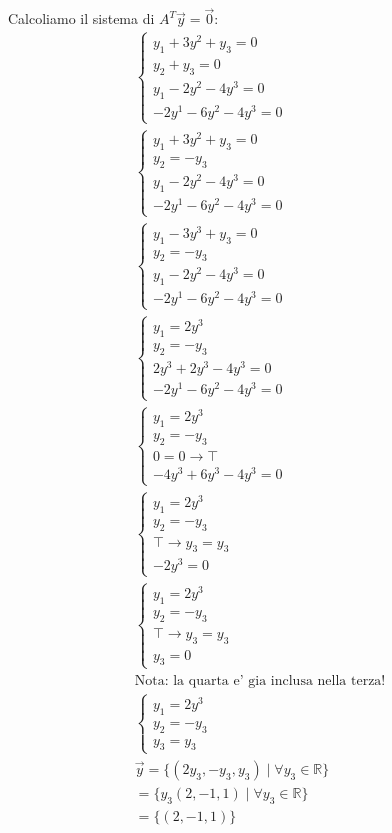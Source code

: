 \documentclass{article}
\begin{document}
Calcoliamo il sistema di $A^T\vec{y}=\vec{0}$:
\begin{align*}
    \begin{cases}
        y_1+3y^2+y_3=0 \\
        y_2+y_3=0 \\
        y_1-2y^2-4y^3=0 \\
        -2y^1-6y^2-4y^3=0
    \end{cases}\\
    \begin{cases}
        y_1+3y^2+y_3=0 \\
        y_2=-y_3 \\
        y_1-2y^2-4y^3=0 \\
        -2y^1-6y^2-4y^3=0
    \end{cases}\\
    \begin{cases}
        y_1-3y^3+y_3=0 \\
        y_2=-y_3 \\
        y_1-2y^2-4y^3=0 \\
        -2y^1-6y^2-4y^3=0
    \end{cases}\\
    \begin{cases}
        y_1=2y^3 \\
        y_2=-y_3 \\
        2y^3+2y^3-4y^3=0 \\
        -2y^1-6y^2-4y^3=0
    \end{cases}\\
    \begin{cases}
        y_1=2y^3 \\
        y_2=-y_3 \\
        0=0 \to \top \\
        -4y^3+6y^3-4y^3=0
    \end{cases}\\
    \begin{cases}
        y_1=2y^3 \\
        y_2=-y_3 \\
       \top \to y_3=y_3\\
        -2y^3=0
    \end{cases}\\
    \begin{cases}
        y_1=2y^3 \\
        y_2=-y_3 \\
       \top \to y_3=y_3\\
        y_3=0 
    \end{cases}\\
    \text{Nota: la quarta e' gia inclusa nella terza!}\\
    \begin{cases}
        y_1=2y^3 \\
        y_2=-y_3 \\
        y_3=y_3
    \end{cases}\\
    \vec{y}=\{(2y_3,-y_3,y_3) \mid \forall y_3 \in \mathbb{R}\}\\
    =\{y_3(2,-1,1) \mid \forall y_3 \in \mathbb{R}\}\\
    = \{(2,-1,1)\} 
\end{align*}
\end{document}
